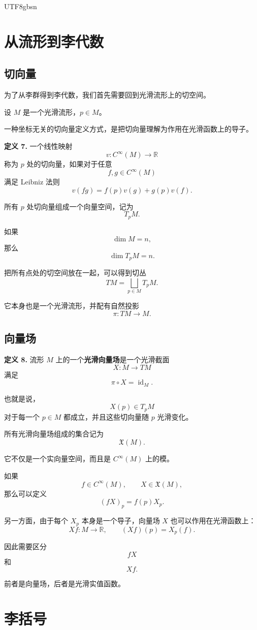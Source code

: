 \documentclass[11pt]{article}
\begin{document}
\begin{CJK*}{UTF8}{gbsn}
\section{从流形到李代数}

\subsection{切向量}

为了从李群得到李代数，我们首先需要回到光滑流形上的切空间。

设 $M$ 是一个光滑流形，$p\in M$。

一种坐标无关的切向量定义方式，是把切向量理解为作用在光滑函数上的导子。

\textbf{定义 7.}
一个线性映射
\[
v:C^\infty(M)\to\mathbb{R}
\]
称为 $p$ 处的切向量，如果对于任意
\[
f,g\in C^\infty(M)
\]
满足 Leibniz 法则
\[
v(fg)
=
f(p)v(g)+g(p)v(f).
\]

所有 $p$ 处切向量组成一个向量空间，记为
\[
T_pM.
\]

如果
\[
\dim M=n,
\]
那么
\[
\dim T_pM=n.
\]

把所有点处的切空间放在一起，可以得到切丛
\[
TM
=
\bigsqcup_{p\in M}T_pM.
\]

它本身也是一个光滑流形，并配有自然投影
\[
\pi:TM\to M.
\]


\subsection{向量场}

\textbf{定义 8.}
流形 $M$ 上的一个\textbf{光滑向量场}是一个光滑截面
\[
X:M\to TM
\]
满足
\[
\pi\circ X=\operatorname{id}_M.
\]

也就是说，
\[
X(p)\in T_pM
\]
对于每一个 $p\in M$ 都成立，并且这些切向量随 $p$ 光滑变化。

所有光滑向量场组成的集合记为
\[
\mathfrak{X}(M).
\]

它不仅是一个实向量空间，而且是 $C^\infty(M)$ 上的模。

如果
\[
f\in C^\infty(M),
\qquad
X\in\mathfrak{X}(M),
\]
那么可以定义
\[
(fX)_p=f(p)X_p.
\]

另一方面，由于每个 $X_p$ 本身是一个导子，向量场 $X$ 也可以作用在光滑函数上：
\[
Xf:M\to\mathbb{R},
\qquad
(Xf)(p)=X_p(f).
\]

因此需要区分
\[
fX
\]
和
\[
Xf.
\]

前者是向量场，后者是光滑实值函数。


\section{李括号}


\end{CJK*}
\end{document}
